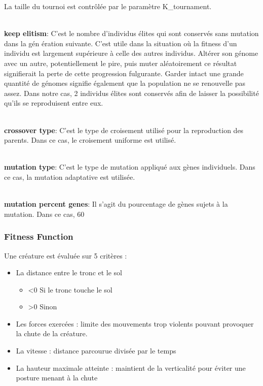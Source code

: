 \documentclass[journal, a4paper]{IEEEtran}
\begin{document}
    La taille du tournoi est contrôlée par le paramètre K\_tournament.

    \\ \textbf{keep elitism}: C'est le nombre d'individus élites
	qui sont conservés sans mutation dans la gén
	ération suivante. C'est utile dans la situation où la fitness d'un
	individu est largement supérieure à celle des autres individus.
	Altérer son génome avec un autre, potentiellement le pire, puis
	muter aléatoirement ce résultat signifierait la perte de cette
	progression fulgurante. Garder intact une grande quantité de
	génomes
	signifie également que la population ne se renouvelle pas assez.
	Dans notre cas, 2 individus
	élites sont conservés afin de laisser la possibilité qu'ils se
	reproduisent entre eux.


    \\ \textbf{crossover type}: C'est le type de croisement utilisé
	pour la reproduction des parents. Dans ce cas, le croisement uniforme est utilisé.

    \\ \textbf{mutation type}: C'est le type de mutation appliqué aux
	gènes individuels. Dans ce cas, la mutation adaptative est utilisée.

    \\ \textbf{mutation percent genes}: Il s'agit du pourcentage de
	gènes sujets à la mutation. Dans ce cas, 60 %


	\subsubsection{Fitness Function}
		Une créature est évaluée sur 5 critères :
		\begin{itemize}
			\item La distance entre le tronc et le sol 
			\begin{itemize}
				\item <0 Si le tronc touche le sol
				\item >0 Sinon
			\end{itemize}
			\item Les forces exercées : limite des mouvements
			trop violents pouvant provoquer la chute de la créature.
			\item La vitesse : distance parcourue divisée par le temps
			\item La hauteur maximale atteinte : maintient de la verticalité
			pour éviter une posture menant à la chute
		\end{itemize}
\end{document}
